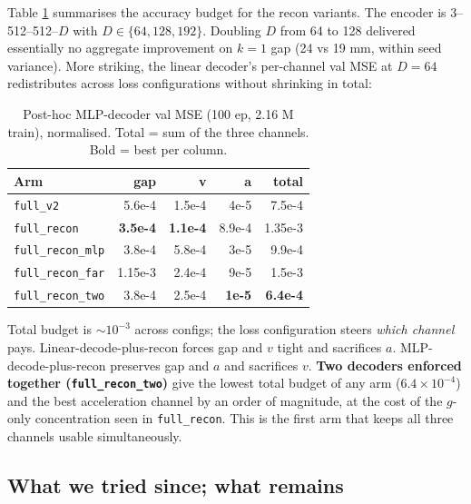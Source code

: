 \documentclass[11pt,a4paper]{article}
\begin{document}
Table \ref{tab:capacity} summarises the accuracy budget for the recon
variants. The encoder is 3--512--512--$D$ with $D \in \{64, 128, 192\}$.
Doubling $D$ from 64 to 128 delivered essentially no aggregate improvement on
$k{=}1$ gap (24 vs 19 mm, within seed variance). More striking, the linear
decoder's per-channel val MSE at $D{=}64$ redistributes across loss
configurations without shrinking in total:

\begin{table}[h]
\centering
\small
\caption{Post-hoc MLP-decoder val MSE (100 ep, 2.16 M train), normalised.
Total = sum of the three channels. Bold = best per column.}
\label{tab:capacity}
\begin{tabular}{lrrrr}
\toprule
Arm & gap & v & a & total \\
\midrule
\texttt{full\_v2}         & 5.6e-4 & 1.5e-4 & 4e-5   & 7.5e-4 \\
\texttt{full\_recon}      & \textbf{3.5e-4} & \textbf{1.1e-4} & 8.9e-4 & 1.35e-3 \\
\texttt{full\_recon\_mlp} & 3.8e-4 & 5.8e-4 & 3e-5   & 9.9e-4 \\
\texttt{full\_recon\_far} & 1.15e-3& 2.4e-4 & 9e-5   & 1.5e-3 \\
\texttt{full\_recon\_two} & 3.8e-4 & 2.5e-4 & \textbf{1e-5}   & \textbf{6.4e-4} \\
\bottomrule
\end{tabular}
\end{table}

Total budget is $\sim 10^{-3}$ across configs; the loss configuration steers
\emph{which channel} pays. Linear-decode-plus-recon forces gap and $v$ tight
and sacrifices $a$. MLP-decode-plus-recon preserves gap and $a$ and
sacrifices $v$. \textbf{Two decoders enforced together
(\texttt{full\_recon\_two})} give the lowest total budget of any arm
($6.4 \times 10^{-4}$) and the best acceleration channel by an order of
magnitude, at the cost of the $g$-only concentration seen in
\texttt{full\_recon}. This is the first arm that keeps all three channels
usable simultaneously.

\subsection{What we tried since; what remains}
\end{document}

